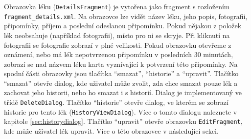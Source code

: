 \documentclass[../TakeYourPill.tex]{subfiles}
\begin{document}
Obrazovka léku (\texttt{DetailsFragment}) je vytořena jako fragment s rozložením \texttt{fragment\_details.xml}. Na obrazovce lze vidět název léku, jeho popis, fotografii, připomínky, příjem a poslední odeslanou připomínku. Pokud nějakou z položek lék neobsahuje (například fotografii), místo pro ni se skryje. Při kliknutí na fotografii se fotografie zobrazí v plné velikosti. Pokud obrazovku otevřeme z oznámení, nebo má lék nepotvrzenou připomínku v posledních 30 minutách, zobrazí se nad názvem léku karta vyznívající k potvrzení této připomínky. Na spodní části obrazovky jsou tlačítka \enquote{smazat}, \enquote{historie} a \enquote{upravit}. Tlačítko \enquote{smazat} otevře dialog, kde uživatel může zvolit, zda chce smazat pouze lék a zachovat jeho historii, nebo ho smazat i s historií. Dialog je implementovaný ve třídě \texttt{DeleteDialog}. Tlačítko \enquote{historie} otevře dialog, ve kterém se zobrazí historie pro tento lék (\texttt{HistoryViewDialog}). Více o tomto dialogu naleznete v kapitole \ref{sec:historydialog}. Tlačítko \enquote{upravit} otevře obrazovku \texttt{EditFragment}, kde může uživatel lék upravit. Více o této obrazovce v následující sekci.
\end{document}
